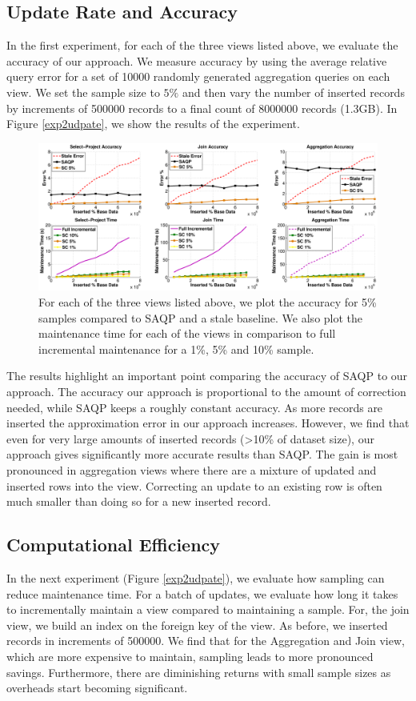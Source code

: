 \subsection{Update Rate and Accuracy}
In the first experiment, for each of the three views listed above, we evaluate the accuracy of our approach.
We measure accuracy by using the average relative query error for a set of 10000 randomly generated aggregation queries on each view.
We set the sample size to $5\%$ and then vary the number of inserted records by increments of 500000 records to a final count of 8000000 records (1.3GB).
In Figure \ref{exp2udpate}, we show the results of the experiment. 

\begin{figure}[ht!]
\label{exp2update}
\centering
 \includegraphics[scale=0.27]{exp/exp2-full.eps}
 \caption{For each of the three views listed above, we plot the accuracy for 5\% samples compared to SAQP and a stale baseline. We also plot the maintenance time for each of the views in comparison to full incremental maintenance for a 1\%, 5\% and 10\% sample. }
\end{figure}

The results highlight an important point comparing the accuracy of SAQP to our approach. 
The accuracy our approach is proportional to the amount of correction needed, while SAQP keeps a roughly constant accuracy.
As more records are inserted the approximation error in our approach increases.
However, we find that even for very large amounts of inserted records (>10\% of dataset size), our approach gives significantly more accurate results
than SAQP.
The gain is most pronounced in aggregation views where there are a mixture of updated and inserted rows into the view.
Correcting an update to an existing row is often much smaller than doing so for a new inserted record.

\subsection{Computational Efficiency}
In the next experiment (Figure \ref{exp2udpate}), we evaluate how sampling can reduce maintenance time.
For a batch of updates, we evaluate how long it takes to incrementally maintain a view compared to maintaining a sample.
For, the join view, we build an index on the foreign key of the view.
As before, we inserted records in increments of 500000.
We find that for the Aggregation and Join view, which are more expensive to maintain, sampling leads to more pronounced savings. 
Furthermore, there are diminishing returns with small sample sizes as overheads start becoming significant.

